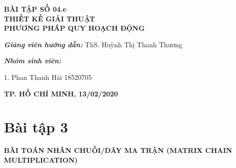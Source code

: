\documentclass[12pt, a4paper, fleqn]{article}
\begin{document}
\begin{titlepage}
\begin{center}
			\vspace{1.5cm}
			
			\Large
			\textbf{BÀI TẬP SỐ 04.e\\THIẾT KẾ GIẢI THUẬT\\PHƯƠNG PHÁP QUY HOẠCH ĐỘNG}
		
		\end{center}
			
			\vspace{2.5cm}
			\normalsize	
			
			\hspace{70pt} \textbf{\textit{Giảng viên hướng dẫn:}} ThS. Huỳnh Thị Thanh Thương\\
			
			\vspace*{1cm}
			
			\hspace{70pt} \textbf{\textit{Nhóm sinh viên:}}
			
			\vspace*{0.4cm}
			
			\hspace{70pt} 1. \hspace{10pt} Phan Thanh Hải  \hspace{45pt} 18520705
			
			\vspace{4cm}
		
		\begin{center}
			\textbf{TP. HỒ CHÍ MINH, 13/02/2020}
		\end{center}
			
	\end{titlepage}

	\begin{center}
		\tableofcontents
	\end{center}
	\clearpage
	
	\setlength{\abovedisplayskip}{5pt}
	\setlength{\belowdisplayskip}{5pt}
	
	
	\section*{Bài tập 3}
	
	
	\textbf{BÀI TOÁN NHÂN CHUỖI/DÃY MA TRẬN (MATRIX CHAIN MULTIPLICATION)}
	
\end{document}
